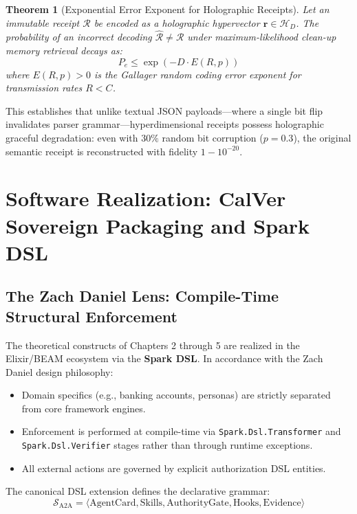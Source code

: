 \documentclass[12pt,oneside,a4paper]{book}
\theoremstyle{definition}
\theoremstyle{plain}
\newtheorem{theorem}{Theorem}[chapter]
\theoremstyle{remark}
\begin{document}
\begin{theorem}[Exponential Error Exponent for Holographic Receipts]
Let an immutable receipt $\mathcal{R}$ be encoded as a holographic hypervector $\mathbf{r} \in \mathcal{H}_D$. The probability of an incorrect decoding $\widehat{\mathcal{R}} \ne \mathcal{R}$ under maximum-likelihood clean-up memory retrieval decays as:
\begin{equation}
    P_e \le \exp\left( - D \cdot E(R, p) \right)
\end{equation}
where $E(R, p) > 0$ is the Gallager random coding error exponent for transmission rates $R < C$.
\end{theorem}

This establishes that unlike textual JSON payloads—where a single bit flip invalidates parser grammar—hyperdimensional receipts possess holographic graceful degradation: even with $30\%$ random bit corruption ($p = 0.3$), the original semantic receipt is reconstructed with fidelity $1 - 10^{-20}$.

\chapter{Software Realization: CalVer Sovereign Packaging and Spark DSL}

\section{The Zach Daniel Lens: Compile-Time Structural Enforcement}
The theoretical constructs of Chapters 2 through 5 are realized in the Elixir/BEAM ecosystem via the \textbf{Spark DSL}. In accordance with the Zach Daniel design philosophy:
\begin{itemize}
    \item Domain specifics (e.g., banking accounts, personas) are strictly separated from core framework engines.
    \item Enforcement is performed at compile-time via \texttt{Spark.Dsl.Transformer} and \texttt{Spark.Dsl.Verifier} stages rather than through runtime exceptions.
    \item All external actions are governed by explicit authorization DSL entities.
\end{itemize}

The canonical DSL extension defines the declarative grammar:
\begin{equation}
    \mathcal{S}_{\text{A2A}} = \langle \text{AgentCard}, \text{Skills}, \text{AuthorityGate}, \text{Hooks}, \text{Evidence} \rangle
\end{equation}
\end{document}
